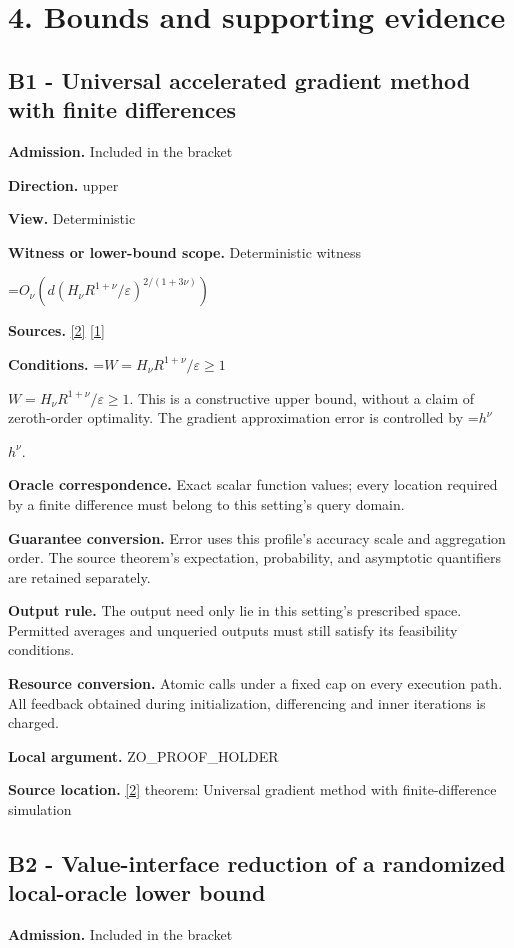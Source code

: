 \documentclass[10pt,a4paper]{article}
\newcommand{\AtlasMath}[1]{\par\begingroup\centering\setbox0=\hbox{$\displaystyle #1$}\ifdim\wd0>1.4\linewidth\typeout{ATLAS WIDE FORMULA: \the\wd0}\fi\ifdim\wd0>\linewidth\resizebox{\linewidth}{!}{\box0}\else\box0\fi\par\endgroup}
\newcommand{\AtlasInlineMath}[1]{\begingroup\setbox0=\hbox{$#1$}\ifdim\wd0>.4\linewidth\endgroup\AtlasMath{#1}\else\endgroup$#1$\fi}
\begin{document}
\section{4. Bounds and supporting evidence}
\subsection{B1 - Universal accelerated gradient method with finite differences}
\textbf{Admission.} Included in the bracket

\textbf{Direction.} upper

\textbf{View.} Deterministic

\textbf{Witness or lower-bound scope.} Deterministic witness

\AtlasMath{O_\nu\!\left(d(H_\nu R^{1+\nu}/\varepsilon)^{2/(1+3\nu)}\right)}
\textbf{Sources.} \href{https://optimization-online.org/wp-content/uploads/2013/04/3833.pdf}{[2]} \href{https://proceedings.mlr.press/v99/diakonikolas19c/diakonikolas19c.pdf}{[1]}

\textbf{Conditions.} \AtlasInlineMath{W=H_\nu R^{1+\nu}/\varepsilon\ge1}. This is a constructive upper bound, without a claim of zeroth-order optimality. The gradient approximation error is controlled by \AtlasInlineMath{h^\nu}.

\textbf{Oracle correspondence.} Exact scalar function values; every location required by a finite difference must belong to this setting's query domain.

\textbf{Guarantee conversion.} Error uses this profile's accuracy scale and aggregation order. The source theorem's expectation, probability, and asymptotic quantifiers are retained separately.

\textbf{Output rule.} The output need only lie in this setting's prescribed space. Permitted averages and unqueried outputs must still satisfy its feasibility conditions.

\textbf{Resource conversion.} Atomic calls under a fixed cap on every execution path. All feedback obtained during initialization, differencing and inner iterations is charged.

\textbf{Local argument.} ZO\_\allowbreak{}PROOF\_\allowbreak{}HOLDER

\textbf{Source location.} \href{https://optimization-online.org/wp-content/uploads/2013/04/3833.pdf}{[2]} theorem: Universal gradient method with finite-difference simulation

\subsection{B2 - Value-interface reduction of a randomized local-oracle lower bound}
\textbf{Admission.} Included in the bracket
\end{document}
